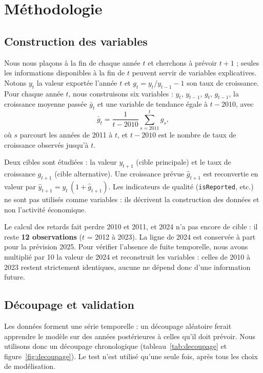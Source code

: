 \documentclass[11pt,a4paper]{article}
\begin{document}
\section{Méthodologie}\label{sec:method}

\subsection{Construction des variables}
Nous nous plaçons à la fin de chaque année $t$ et cherchons à prévoir $t+1$ ; seules les informations disponibles à la fin de $t$ peuvent servir de variables explicatives. Notons $y_t$ la valeur exportée l'année $t$ et $g_t = y_t / y_{t-1} - 1$ son taux de croissance. Pour chaque année $t$, nous construisons six variables : $y_t$, $y_{t-1}$, $g_t$, $g_{t-1}$, la croissance moyenne passée $\bar{g}_t$ et une variable de tendance égale à $t-2010$, avec
\begin{equation}\label{eq:gmoy}
\bar{g}_t = \frac{1}{t-2010}\sum_{s=2011}^{t} g_s ,
\end{equation}
où $s$ parcourt les années de 2011 à $t$, et $t-2010$ est le nombre de taux de croissance observés jusqu'à $t$.

Deux cibles sont étudiées : la valeur $y_{t+1}$ (cible principale) et le taux de croissance $g_{t+1}$ (cible alternative). Une croissance prévue $\widehat{g}_{t+1}$ est reconvertie en valeur par $\widehat{y}_{t+1} = y_t\,(1+\widehat{g}_{t+1})$. Les indicateurs de qualité (\texttt{isReported}, etc.) ne sont pas utilisés comme variables : ils décrivent la construction des données et non l'activité économique.

Le calcul des retards fait perdre 2010 et 2011, et 2024 n'a pas encore de cible : il reste \textbf{12 observations} ($t$ = 2012 à 2023). La ligne de 2024 est conservée à part pour la prévision 2025. Pour vérifier l'absence de fuite temporelle, nous avons multiplié par 10 la valeur de 2024 et reconstruit les variables : celles de 2010 à 2023 restent strictement identiques, aucune ne dépend donc d'une information future.

\subsection{Découpage et validation}
Les données forment une série temporelle : un découpage aléatoire ferait apprendre le modèle sur des années postérieures à celles qu'il doit prévoir. Nous utilisons donc un découpage chronologique (tableau~\ref{tab:decoupage} et figure~\ref{fig:decoupage}). Le test n'est utilisé qu'une seule fois, après tous les choix de modélisation.
\end{document}
